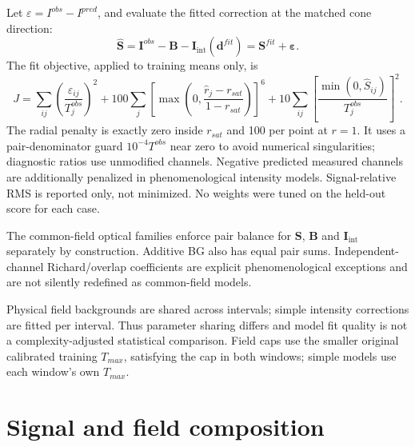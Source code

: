 \documentclass[10pt,a4paper]{article}
\begin{document}
Let $\varepsilon=I^{obs}-I^{pred}$, and evaluate the fitted correction at the matched cone direction:
\[
\widehat{\mathbf S}=\mathbf I^{obs}-\mathbf B-\mathbf I_{\mathrm{int}}(\mathbf d^{fit})=\mathbf S^{fit}+\boldsymbol\varepsilon.
\]
The fit objective, applied to training means only, is
\[
J=\sum_{ij}\left(\frac{\varepsilon_{ij}}{T_j^{obs}}\right)^2
+100\sum_j\left[\max\left(0,\frac{\widehat r_j-r_{sat}}{1-r_{sat}}\right)\right]^6
+10\sum_{ij}\left[\frac{\min(0,\widehat S_{ij})}{T_j^{obs}}\right]^2.
\]
The radial penalty is exactly zero inside $r_{sat}$ and 100 per point at $r=1$. It uses a pair-denominator guard $10^{-4}T^{obs}$ near zero to avoid numerical singularities; diagnostic ratios use unmodified channels. Negative predicted measured channels are additionally penalized in phenomenological intensity models. Signal-relative RMS is reported only, not minimized. No weights were tuned on the held-out score for each case.

The common-field optical families enforce pair balance for $\mathbf S$, $\mathbf B$ and $\mathbf I_{\mathrm{int}}$ separately by construction. Additive BG also has equal pair sums. Independent-channel Richard/overlap coefficients are explicit phenomenological exceptions and are not silently redefined as common-field models.

Physical field backgrounds are shared across intervals; simple intensity corrections are fitted per interval. Thus parameter sharing differs and model fit quality is not a complexity-adjusted statistical comparison. Field caps use the smaller original calibrated training $T_{max}$, satisfying the cap in both windows; simple models use each window's own $T_{max}$.
\newpage
\section{Signal and field composition}
\end{document}
